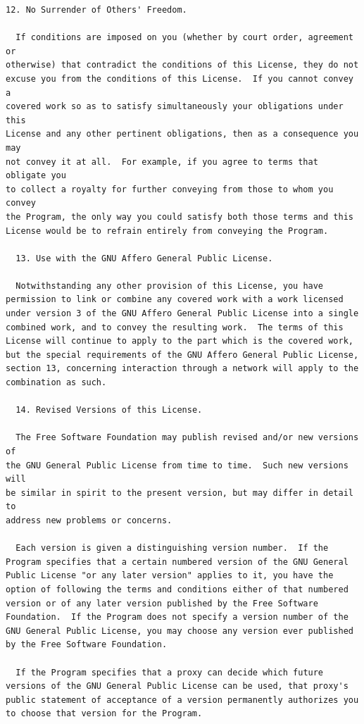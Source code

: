 \documentclass[letterpaper,10pt,english]{sphinxmanual}
\begin{document}
\begin{Verbatim}[commandchars=\\\{\}]
  12. No Surrender of Others' Freedom.

  If conditions are imposed on you (whether by court order, agreement or
otherwise) that contradict the conditions of this License, they do not
excuse you from the conditions of this License.  If you cannot convey a
covered work so as to satisfy simultaneously your obligations under this
License and any other pertinent obligations, then as a consequence you may
not convey it at all.  For example, if you agree to terms that obligate you
to collect a royalty for further conveying from those to whom you convey
the Program, the only way you could satisfy both those terms and this
License would be to refrain entirely from conveying the Program.

  13. Use with the GNU Affero General Public License.

  Notwithstanding any other provision of this License, you have
permission to link or combine any covered work with a work licensed
under version 3 of the GNU Affero General Public License into a single
combined work, and to convey the resulting work.  The terms of this
License will continue to apply to the part which is the covered work,
but the special requirements of the GNU Affero General Public License,
section 13, concerning interaction through a network will apply to the
combination as such.

  14. Revised Versions of this License.

  The Free Software Foundation may publish revised and/or new versions of
the GNU General Public License from time to time.  Such new versions will
be similar in spirit to the present version, but may differ in detail to
address new problems or concerns.

  Each version is given a distinguishing version number.  If the
Program specifies that a certain numbered version of the GNU General
Public License "or any later version" applies to it, you have the
option of following the terms and conditions either of that numbered
version or of any later version published by the Free Software
Foundation.  If the Program does not specify a version number of the
GNU General Public License, you may choose any version ever published
by the Free Software Foundation.

  If the Program specifies that a proxy can decide which future
versions of the GNU General Public License can be used, that proxy's
public statement of acceptance of a version permanently authorizes you
to choose that version for the Program.


\end{Verbatim}
\end{document}

